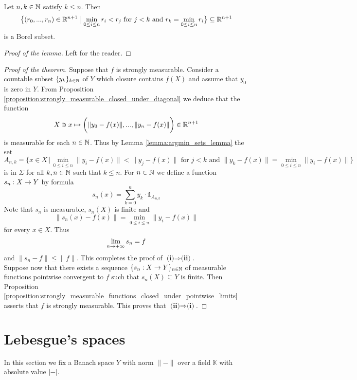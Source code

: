 \begin{lemma}\label{lemma:argmin_sets_lemma}
Let $n,k\in {\mathbb N}$ satisfy $k \leq n$. Then
$$\big\{(r_0,...,r_n)\in {\mathbb R}^{n+1}\,\big|\,\min_{0\leq i\leq n} r_i < r_j\mbox{ for }j < k\mbox{ and }r_k = \min_{0\leq i\leq n} r_i\big\} \subseteq {\mathbb R}^{n+1}$$
is a Borel subset.
\end{lemma}
\begin{proof}[Proof of the lemma]
Left for the reader.
\end{proof}

\begin{proof}[Proof of the theorem]
Suppose that $f$ is strongly measurable. Consider a countable subset $\{y_k\}_{k\in {\mathbb N}}$ of $Y$ which closure contains $f(X)$ and assume that $y_0$ is zero in $Y$. From Proposition \ref{proposition:strongly_measurable_closed_under_diagonal} we deduce that the function
$$X\ni x\mapsto \bigg(\lVert y_0 - f(x)\rVert,...,\lVert y_n - f(x)\rVert \bigg)\in {\mathbb R}^{n+1}$$
is measurable for each $n \in {\mathbb N}$. Thus by Lemma \ref{lemma:argmin_sets_lemma} the set
$$A_{n,k} = \big\{x \in X\,\big|\,\min_{0\leq i\leq n}\lVert y_i - f(x)\rVert < \lVert y_j - f(x)\rVert \mbox{ for }j < k\mbox{ and }\lVert y_k - f(x)\rVert = \min_{0\leq i\leq n}\lVert y_i - f(x)\rVert\big\}$$
is in $\Sigma$ for all $k,n\in {\mathbb N}$ such that $k \leq n$. For $n\in {\mathbb N}$ we define a function $s_n:X\rightarrow Y$ by formula
$$s_n(x) = \sum_{k=0}^ny_k\cdot \mathbb{1}_{A_{n,k}}$$
Note that $s_n$ is measurable, $s_n(X)$ is finite and
$$\lVert s_n(x) - f(x)\rVert = \min_{0\leq i\leq n}\lVert y_i - f(x)\rVert$$
for every $x \in X$. Thus
$$\lim_{n\rightarrow +\infty}s_n = f$$
and $\lVert s_n - f\rVert \leq  \lVert f\rVert$. This completes the proof of $\textbf{(i)}\Rightarrow \textbf{(ii)}$.\\
Suppose now that there exists a sequence $\{s_n:X\rightarrow Y\}_{n\in {\mathbb N}}$ of measurable functions pointwise convergent to $f$ such that $s_n(X)\subseteq Y$ is finite. Then Proposition \ref{proposition:strongly_measurable_functions_closed_under_pointwise_limits} asserts that $f$ is strongly measurable. This proves that $\textbf{(ii)}\Rightarrow \textbf{(i)}$.
\end{proof}

\section{Lebesgue's spaces}\label{section:lebesgue_spaces}
\noindent
In this section we fix a Banach space $Y$ with norm $\lVert-\rVert$ over a field $\mathbb{K}$ with absolute value $|-|$.

